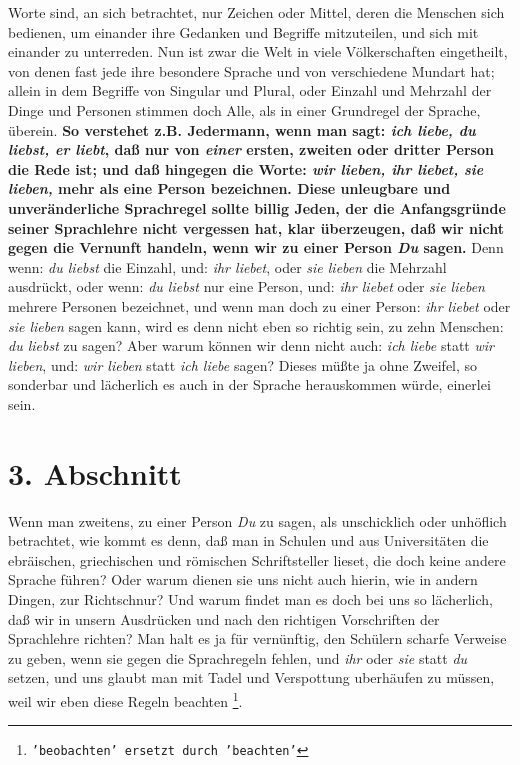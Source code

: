  Worte sind, an sich betrachtet, nur Zeichen oder Mittel, deren die Menschen sich
bedienen, um einander ihre Gedanken und Begriffe mitzuteilen, und sich mit
einander zu unterreden. Nun ist zwar die Welt in viele Völkerschaften
eingetheilt, von denen fast jede ihre besondere Sprache und von verschiedene
Mundart hat; allein in dem Begriffe von Singular und Plural, oder
Einzahl und Mehrzahl der Dinge und Personen stimmen doch Alle, als in
einer Grundregel der Sprache, überein. \textbf{So verstehet z.B. Jedermann, wenn man
sagt: \textit{ich liebe, du liebst, er liebt}, daß nur von \textit{einer} ersten, zweiten
oder dritter Person die Rede ist; und daß hingegen die Worte: \textit{wir lieben, ihr
liebet, sie lieben,} mehr als eine Person bezeichnen. Diese unleugbare und
unveränderliche Sprachregel sollte billig Jeden, der die Anfangsgründe seiner
Sprachlehre nicht vergessen hat, klar überzeugen, daß wir nicht gegen die
Vernunft handeln, wenn wir zu einer Person \textit{Du} sagen.} Denn wenn: \textit{du
liebst} die Einzahl, und: \textit{ihr liebet}, oder \textit{sie lieben} die Mehrzahl
ausdrückt, oder wenn: \textit{du liebst} nur eine Person, und: \textit{ihr liebet} oder
\textit{sie lieben} mehrere Personen bezeichnet, und wenn man doch zu einer Person:
\textit{ihr liebet} oder \textit{sie lieben} sagen kann, wird es denn nicht eben so
richtig sein, zu zehn Menschen: \textit{du liebst} zu sagen? Aber warum können wir
denn nicht auch: \textit{ich liebe} statt \textit{wir lieben}, und: \textit{wir lieben} statt
\textit{ich liebe} sagen? Dieses müßte ja ohne Zweifel, so sonderbar und lächerlich
es auch in der Sprache herauskommen würde, einerlei sein.

\section{3. Abschnitt} \label{kap10_ab3}

Wenn man zweitens, zu einer Person \textit{Du} zu sagen, als unschicklich oder
unhöflich betrachtet, wie kommt es denn, daß man in Schulen und aus
Universitäten die ebräischen, griechischen und römischen Schriftsteller lieset,
die doch keine andere Sprache führen? Oder warum dienen sie uns nicht auch
hierin, wie in andern Dingen, zur Richtschnur? Und warum findet man es doch bei
uns so lächerlich, daß wir in unsern Ausdrücken und nach den richtigen
Vorschriften der Sprachlehre richten? Man halt es ja für vernünftig, den
Schülern scharfe Verweise zu geben, wenn sie gegen die Sprachregeln fehlen, und
\textit{ihr} oder \textit{sie} statt \textit{du} setzen, und uns glaubt man mit Tadel und Verspottung
uberhäufen zu müssen, weil wir eben diese Regeln beachten
\footnote{\texttt{'beobachten' ersetzt durch 'beachten'}}.

